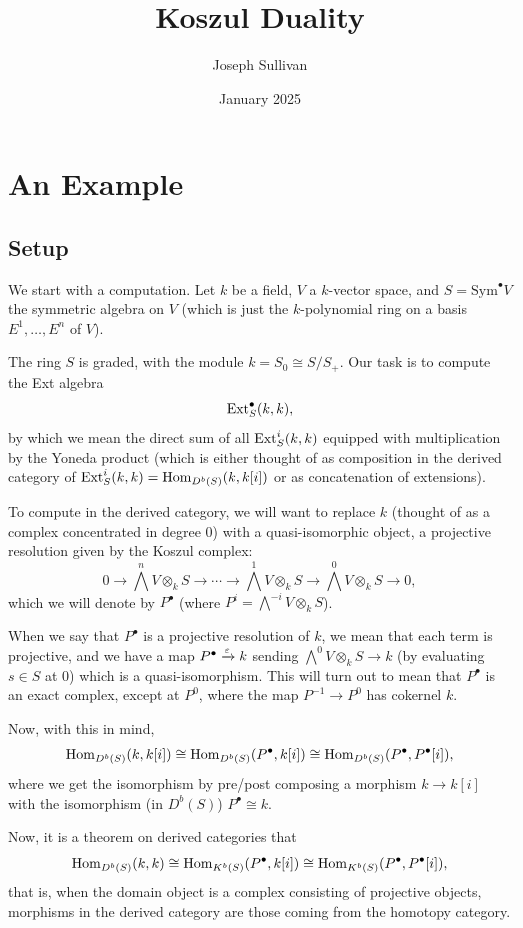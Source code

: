 \documentclass[12pt]{article}
\title{Koszul Duality}
\author{Joseph Sullivan}
\date{January 2025}
\newcommand{\Sym}{\mathrm{Sym}}
\begin{document}
\maketitle

\tableofcontents

\section{An Example}

\subsection{Setup}
We start with a computation. Let $k$ be a field, $V$ a $k$-vector space, and $S=\Sym^\bullet V$ the symmetric algebra on $V$ (which is just the $k$-polynomial ring on a basis $E^1,\dots,E^n$ of $V$).

The ring $S$ is graded, with the module $k=S_0\cong S/S_+$. Our task is to compute the Ext algebra
\[\mathrm{Ext}_S^\bullet(k,k),\]
by which we mean the direct sum of all $\mathrm{Ext}_S^i(k,k)$ equipped with multiplication by the Yoneda product (which is either thought of as composition in the derived category of $\mathrm{Ext}_S^i(k,k)=\mathrm{Hom}_{D^b(S)}(k,k[i])$ or as concatenation of extensions).

To compute in the derived category, we will want to replace $k$ (thought of as a complex concentrated in degree 0) with a quasi-isomorphic object, a projective resolution given by the Koszul complex:
\[0\to \bigwedge^n V \otimes_k S \to \cdots \to \bigwedge^1 V \otimes_k S \to \bigwedge^0 V \otimes_k S \to 0,\]
which we will denote by $P^\bullet$ (where $P^i=\bigwedge^{-i} V \otimes_k S$).

When we say that $P^\bullet$ is a projective resolution of $k$, we mean that each term is projective, and we have a map $P^\bullet \xrightarrow{\varepsilon} k$ sending $\bigwedge^0 V \otimes_k S \to k$ (by evaluating $s\in S$ at $0$) which is a quasi-isomorphism. This will turn out to mean that $P^\bullet$ is an exact complex, except at $P^0$, where the map $P^{-1}\to P^0$ has cokernel $k$.

Now, with this in mind,
\[\mathrm{Hom}_{D^b(S)}(k,k[i]) \cong \mathrm{Hom}_{D^b(S)}(P^\bullet,k[i]) \cong \mathrm{Hom}_{D^b(S)}(P^\bullet, P^\bullet[i]),\]
where we get the isomorphism by pre/post composing a morphism $k\to k[i]$ with the isomorphism (in $D^b(S)$) $P^\bullet \cong k$.

Now, it is a theorem on derived categories that
\[\mathrm{Hom}_{D^b(S)}(k, k) \cong \mathrm{Hom}_{K^b(S)}(P^\bullet, k[i]) \cong \mathrm{Hom}_{K^b(S)}(P^\bullet, P^\bullet[i]),\]
that is, when the domain object is a complex consisting of projective objects, morphisms in the derived category are those coming from the homotopy category.
\end{document}
